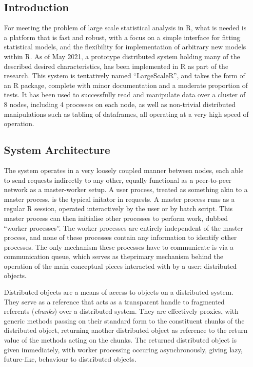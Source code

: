 \subsection{Introduction}

For meeting the problem of large scale statistical analysis in R, what is needed is a platform that is fast and robust, with a focus on a simple interface for fitting statistical models, and the flexibility for implementation of arbitrary new models within R.
As of May 2021, a prototype distributed system holding many of the described desired characteristics, has been implemented in R as part of the research.
This system is tentatively named ``LargeScaleR'', and takes the form of an R package, complete with minor documentation and a moderate proportion of tests.
It has been used to successfully read and manipulate data over a cluster of 8 nodes, including 4 processes on each node, as well as non-trivial distributed manipulations such as tabling of dataframes, all operating at a very high speed of operation.

\subsection{System Architecture}\label{sec:sys-imp}

The system operates in a very loosely coupled manner between nodes, each able to send requests indirectly to any other, equally functional as a peer-to-peer network as a master-worker setup.
A user process, treated as something akin to a master process, is the typical initator in requests. 
A master process runs as a regular R session, operated interactively by the user or by batch script.
This master process can then initialise other processes to perform work, dubbed ``worker processes''.
The worker processes are entirely independent of the master process, and none of these processes contain any information to identify other processes.
The only mechanism these processes have to communicate is via a communication queue, which serves as theprimary mechanism behind the operation of the main conceptual pieces interacted with by a user: distributed objects.

Distributed objects are a means of access to objects on a distributed system.
They serve as a reference that acts as a transparent handle to fragmented referents (\textit{chunks}) over a distributed system.
They are effectively proxies, with generic methods passing on their standard form to the constituent chunks of the distributed object, returning another distributed object as reference to the return value of the methods acting on the chunks.
The returned distributed object is given immediately, with worker processing occuring asynchronously, giving lazy, future-like, behaviour to distributed objects.

